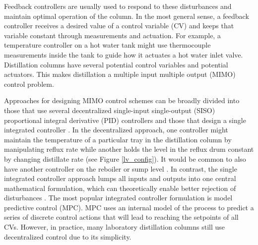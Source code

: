 Feedback controllers are usually used to respond to these disturbances and maintain optimal operation of the column.  In the most general sense, a feedback controller receives a desired value of a control variable (CV) and keeps that variable constant through measurements and actuation. For example, a temperature controller on a hot water tank might use thermocouple measurements inside the tank to guide how it actuates a hot water inlet valve. Distillation columns have several potential control variables and potential actuators. This makes distillation a multiple input multiple output (MIMO) control problem. 

Approaches for designing MIMO control schemes can be broadly divided into those that use several decentralized single-input single-output (SISO) proportional integral derivative (PID) controllers\cite{Behroozsarand2012, Shen1994, Lin2006, Luyben1986} and those that design a single integrated controller \cite{Martin2013, Mesbah2017,Spielberg2019,Terzi2020}. In the decentralized approach, one controller might maintain the temperature of a particular tray in the distillation column by manipulating reflux rate while another holds the level in the reflux drum constant by changing distillate rate (see Figure \ref{lv_config}). It would be common to also have another controller on the reboiler or sump level \cite{Skogestad2007}. In contrast, the single integrated controller approach lumps all inputs and outputs into one central mathematical formulation, which can theoretically enable better rejection of disturbances \cite{Mesbah2017}. The most popular integrated controller formulation is model predictive control (MPC). MPC uses an internal model of the process to predict a series of discrete control actions that will lead to reaching the setpoints of all CVs.  However, in practice, many laboratory distillation columns still use decentralized control due to its simplicity.


